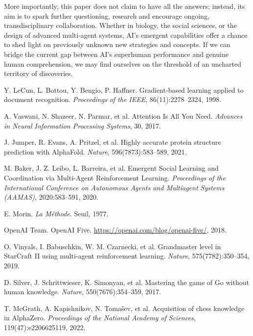 \documentclass[11pt]{article}
\begin{document}
More importantly, this paper does not claim to have all the answers; instead, its aim is to spark further questioning, research and encourage ongoing, transdisciplinary collaboration. Whether in biology, the social sciences, or the design of advanced multi-agent systems, AI's emergent capabilities offer a chance to shed light on previously unknown new strategies and concepts. If we can bridge the current gap between AI's superhuman performance and genuine human comprehension, we may find ourselves on the threshold of an uncharted territory of discoveries.

\begin{thebibliography}{9}

Y. LeCun, L. Bottou, Y. Bengio, P. Haffner.
\newblock Gradient-based learning applied to document recognition.
\newblock \emph{Proceedings of the IEEE}, 86(11):2278--2324, 1998.

A. Vaswani, N. Shazeer, N. Parmar, et al.
\newblock Attention Is All You Need.
\newblock \emph{Advances in Neural Information Processing Systems}, 30, 2017.

J. Jumper, R. Evans, A. Pritzel, et al.
\newblock Highly accurate protein structure prediction with AlphaFold.
\newblock \emph{Nature}, 596(7873):583--589, 2021.

M. Baker, J. Z. Leibo, L. Barreira, et al.
\newblock Emergent Social Learning and Coordination via Multi-Agent Reinforcement Learning.
\newblock \emph{Proceedings of the International Conference on Autonomous Agents and Multiagent Systems (AAMAS)}, 2020:583--591, 2020.

E. Morin.
\newblock \emph{La Méthode}.
\newblock Seuil, 1977.

OpenAI Team.
\newblock OpenAI Five.
\newblock \url{https://openai.com/blog/openai-five/}, 2018.

O. Vinyals, I. Babuschkin, W. M. Czarnecki, et al.
\newblock Grandmaster level in StarCraft II using multi-agent reinforcement learning.
\newblock \emph{Nature}, 575(7782):350--354, 2019.

D. Silver, J. Schrittwieser, K. Simonyan, et al.
\newblock Mastering the game of Go without human knowledge.
\newblock \emph{Nature}, 550(7676):354--359, 2017.

T. McGrath, A. Kapishnikov, N. Tomašev, et al.
\newblock Acquisition of chess knowledge in AlphaZero.
\newblock \emph{Proceedings of the National Academy of Sciences}, 119(47):e2206625119, 2022.


\end{thebibliography}
\end{document}

